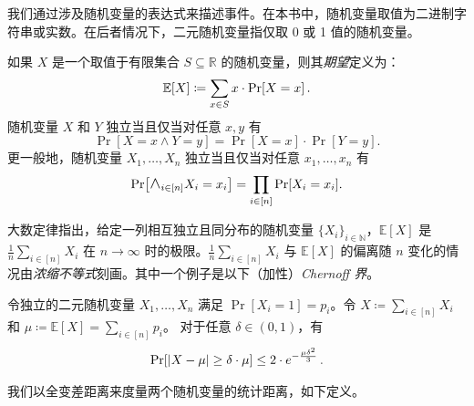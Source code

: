 \documentclass[american,singlepageview]{snargs-book-zh}
\renewcommand{\enspace}{\ensuremath{\thinspace}}
\newcommand{\DefineEqual}{\coloneqq}
\newcommand{\Expectation}{\mathbb{E}}
\newcommand{\RandomVariableX}{X}
\newcommand{\RandomVariableY}{Y}
\newcommand{\RandomVariableSupport}{S}
\newcommand{\idxland}[1]{\scalebox{1.3}{$\land$}_{#1}}
\newcommand{\AbsValue}[1]{\left|{#1}\right|}
\newcommand{\Naturals}{\mathbb{N}}
\newcommand{\Reals}{\mathbb{R}}
\begin{document}
我们通过涉及随机变量的表达式来描述事件。在本书中，随机变量取值为二进制字符串或实数。在后者情况下，二元随机变量指仅取 0 或 1 值的随机变量。

如果 $\RandomVariableX$ 是一个取值于有限集合 $\RandomVariableSupport \subseteq \Reals$ 的随机变量，则其\emph{期望}定义为：
\begin{equation*}
\Expectation[\RandomVariableX]
\DefineEqual
\sum_{x \in \RandomVariableSupport}
x \cdot \Pr[\RandomVariableX=x]
\enspace.
\end{equation*}
随机变量 $\RandomVariableX$ 和 $\RandomVariableY$ 独立当且仅当对任意 $x,y$ 有
\[
\Pr[\RandomVariableX=x \land \RandomVariableY=y]
=
\Pr[\RandomVariableX=x] \cdot \Pr[\RandomVariableY=y].
\]
更一般地，随机变量 $\RandomVariableX_{1},\dots,\RandomVariableX_{n}$ 独立当且仅当对任意 $x_{1},\dots,x_{n}$ 有
\[
\Pr\bigl[\idxland{i \in [n]} \RandomVariableX_{i}=x_{i}\bigr]
=
\prod_{i \in [n]} \Pr[\RandomVariableX_{i}=x_{i}].
\]

大数定律指出，给定一列相互独立且同分布的随机变量 $\{\RandomVariableX_{i}\}_{i \in \Naturals}$，$\Expectation[\RandomVariableX]$ 是
$\frac{1}{n} \sum_{i \in [n]} \RandomVariableX_{i}$
在 $n \to \infty$ 时的极限。$\frac{1}{n} \sum_{i \in [n]} \RandomVariableX_{i}$ 与 $\Expectation[\RandomVariableX]$ 的偏离随 $n$ 变化的情况由\emph{浓缩不等式}刻画。其中一个例子是以下（加性）\emph{Chernoff 界}。

\begin{lemma}
\label{lemma:chernoff-bound}
令独立的二元随机变量 $\RandomVariableX_{1},\ldots,\RandomVariableX_{n}$ 满足
$\Pr[\RandomVariableX_{i}=1] = p_{i}$。令
$\RandomVariableX \DefineEqual \sum_{i \in [n]} \RandomVariableX_{i}$
和
$\mu \DefineEqual \Expectation[\RandomVariableX] = \sum_{i \in [n]} p_{i}$。
对于任意 $\delta \in (0,1)$，有
\begin{align*}
\Pr[\AbsValue{\RandomVariableX - \mu} \geq \delta \cdot \mu]
\leq 2 \cdot e^{-\frac{\mu \delta^2}{3}}
\enspace.
\end{align*}
\end{lemma}

我们以全变差距离来度量两个随机变量的统计距离，如下定义。
\end{document}
